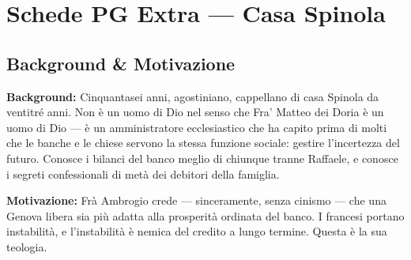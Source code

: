 
\chapter{Schede PG Extra --- Casa Spinola}



\section*{Background \& Motivazione}

\begin{rulebox}{}
  \textbf{Background:} Cinquantasei anni, agostiniano, cappellano di casa
  Spinola da ventitré anni. Non è un uomo di Dio nel senso che Fra' Matteo
  dei Doria è un uomo di Dio — è un amministratore ecclesiastico che ha
  capito prima di molti che le banche e le chiese servono la stessa funzione
  sociale: gestire l'incertezza del futuro. Conosce i bilanci del banco meglio
  di chiunque tranne Raffaele, e conosce i segreti confessionali di metà dei
  debitori della famiglia.

  \medskip\noindent\textcolor{SpinolaRed}{\textbf{Motivazione:}} Frà Ambrogio
  crede — sinceramente, senza cinismo — che una Genova libera sia più adatta
  alla prosperità ordinata del banco. I francesi portano instabilità, e
  l'instabilità è nemica del credito a lungo termine. Questa è la sua teologia.
\end{rulebox}

